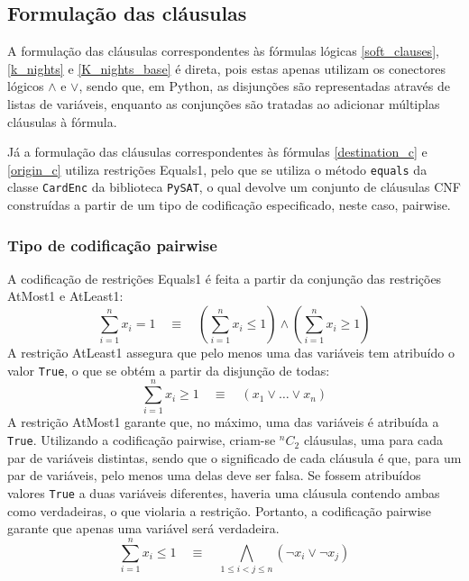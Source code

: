 \documentclass[12pt,a4paper]{article}
\begin{document}
    \subsection{Formulação das cláusulas}
        A formulação das cláusulas correspondentes às fórmulas lógicas \ref{soft_clauses}, \ref{k_nights} e \ref{K_nights_base} é direta, pois estas apenas utilizam os conectores lógicos $\land$ e $\lor$, sendo que, em Python, as disjunções são representadas através de listas de variáveis, enquanto as conjunções são tratadas ao adicionar múltiplas cláusulas à fórmula.

        Já a formulação das cláusulas correspondentes às fórmulas \ref{destination_c} e \ref{origin_c} utiliza restrições Equals1, pelo que se utiliza o método \texttt{equals} da classe \texttt{CardEnc} da biblioteca \texttt{PySAT}, o qual devolve um conjunto de cláusulas CNF construídas a partir de um tipo de codificação especificado, neste caso, pairwise.

    \subsubsection{Tipo de codificação pairwise}
        A codificação de restrições Equals1 é feita a partir da conjunção das restrições AtMost1 e AtLeast1:
        \begin{equation}
            \sum_{i=1}^{n} x_i = 1 \quad \equiv \quad \left( \sum_{i=1}^{n} x_i \leq 1 \right) \land \left( \sum_{i=1}^{n} x_i \geq 1 \right)
        \end{equation}
        A restrição AtLeast1 assegura que pelo menos uma das variáveis tem atribuído o valor \texttt{True}, o que se obtém a partir da disjunção de todas:
        \begin{equation}
            \sum_{i=1}^{n} x_i \geq 1 \quad \equiv \quad \left( x_1 \lor \dots \lor x_n \right)
        \end{equation}
        A restrição AtMost1 garante que, no máximo, uma das variáveis é atribuída a \texttt{True}. Utilizando a codificação pairwise, criam-se $^nC_2$ cláusulas, uma para cada par de variáveis distintas, sendo que o significado de cada cláusula é que, para um par de variáveis, pelo menos uma delas deve ser falsa. Se fossem atribuídos valores \texttt{True} a duas variáveis diferentes, haveria uma cláusula contendo ambas como verdadeiras, o que violaria a restrição. Portanto, a codificação pairwise garante que apenas uma variável será verdadeira.
        \begin{equation}
            \sum_{i=1}^{n} x_i \leq 1 \quad \equiv \quad \bigwedge_{1 \leq i < j \leq n} \left( \neg x_i \lor \neg x_j \right)
        \end{equation}
\end{document}
